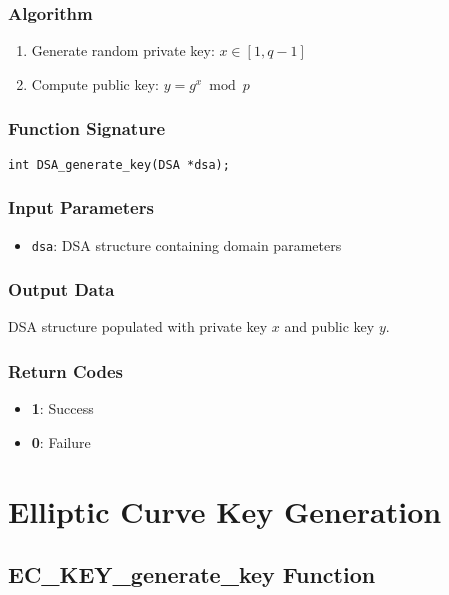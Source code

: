\subsubsection{Algorithm}
\begin{enumerate}
    \item Generate random private key: $x \in [1, q-1]$
    \item Compute public key: $y = g^x \bmod p$
\end{enumerate}

\subsubsection{Function Signature}
\begin{verbatim}
int DSA_generate_key(DSA *dsa);
\end{verbatim}

\subsubsection{Input Parameters}
\begin{itemize}
    \item \texttt{dsa}: DSA structure containing domain parameters
\end{itemize}

\subsubsection{Output Data}
DSA structure populated with private key $x$ and public key $y$.

\subsubsection{Return Codes}
\begin{itemize}
    \item \textbf{1}: Success
    \item \textbf{0}: Failure
\end{itemize}

\section{Elliptic Curve Key Generation}

\subsection{EC\_KEY\_generate\_key Function}

